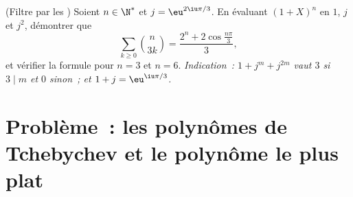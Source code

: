 \begin{exercise}[$\star\star$]\label{exo:b1:poly:12}
(Filtre par les ) Soient $n \in \N^*$ et $j =
\eu^{2\iu\pi/3}$. En évaluant $(1 + X)^n$ en $1$, $j$ et $j^2$,
démontrer que
\[
\sum_{k \geq 0} \binom{n}{3k}
= \frac{2^n + 2\cos\frac{n\pi}{3}}{3} ,
\]
et vérifier la formule pour $n = 3$ et $n = 6$. \emph{Indication~: $1 +
j^m + j^{2m}$ vaut $3$ si $3 \mid m$ et $0$ sinon~; et $1 + j =
\eu^{\iu\pi/3}$.}
\end{exercise}

\section{Problème~: les polynômes de Tchebychev et le polynôme le plus plat}

